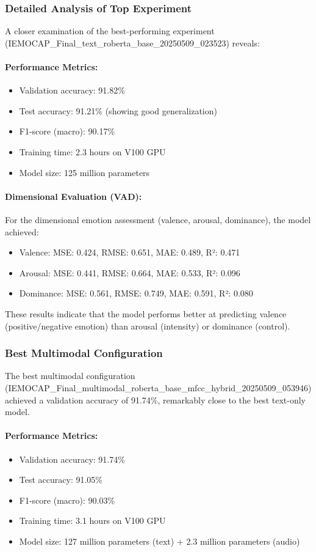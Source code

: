 \documentclass[12pt]{article}
\begin{document}
\subsubsection{Detailed Analysis of Top Experiment}
A closer examination of the best-performing experiment (IEMOCAP\_Final\_text\_roberta\_base\_20250509\_023523) reveals:

\paragraph{Performance Metrics:}
\begin{itemize}
    \item Validation accuracy: 91.82\%
    \item Test accuracy: 91.21\% (showing good generalization)
    \item F1-score (macro): 90.17\%
    \item Training time: 2.3 hours on V100 GPU
    \item Model size: 125 million parameters
\end{itemize}

\paragraph{Dimensional Evaluation (VAD):}
For the dimensional emotion assessment (valence, arousal, dominance), the model achieved:
\begin{itemize}
    \item Valence: MSE: 0.424, RMSE: 0.651, MAE: 0.489, R²: 0.471
    \item Arousal: MSE: 0.441, RMSE: 0.664, MAE: 0.533, R²: 0.096
    \item Dominance: MSE: 0.561, RMSE: 0.749, MAE: 0.591, R²: 0.080
\end{itemize}

These results indicate that the model performs better at predicting valence (positive/negative emotion) than arousal (intensity) or dominance (control).

\subsubsection{Best Multimodal Configuration}
The best multimodal configuration (IEMOCAP\_Final\_multimodal\_roberta\_base\_mfcc\_hybrid\_20250509\_053946) achieved a validation accuracy of 91.74\%, remarkably close to the best text-only model.

\paragraph{Performance Metrics:}
\begin{itemize}
    \item Validation accuracy: 91.74\%
    \item Test accuracy: 91.05\%
    \item F1-score (macro): 90.03\%
    \item Training time: 3.1 hours on V100 GPU
    \item Model size: 127 million parameters (text) + 2.3 million parameters (audio)
\end{itemize}
\end{document}
